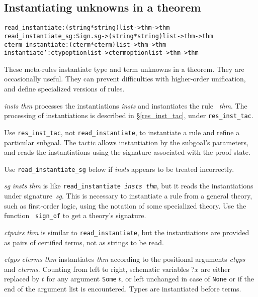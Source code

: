 \subsection{Instantiating unknowns in a theorem} \label{sec:instantiate}
\begin{alltt}\footnotesize
read_instantiate    :                (string*string) list -> thm -> thm
read_instantiate_sg :     Sign.sg -> (string*string) list -> thm -> thm
cterm_instantiate   :                  (cterm*cterm) list -> thm -> thm
instantiate'      : ctyp option list -> cterm option list -> thm -> thm
\end{alltt}
These meta-rules instantiate type and term unknowns in a theorem.  They are
occasionally useful.  They can prevent difficulties with higher-order
unification, and define specialized versions of rules.
\begin{ttdescription}
\item[\ttindexbold{read_instantiate} {\it insts} {\it thm}] 
processes the instantiations {\it insts} and instantiates the rule~{\it
thm}.  The processing of instantiations is described
in \S\ref{res_inst_tac}, under {\tt res_inst_tac}.  

Use {\tt res_inst_tac}, not {\tt read_instantiate}, to instantiate a rule
and refine a particular subgoal.  The tactic allows instantiation by the
subgoal's parameters, and reads the instantiations using the signature
associated with the proof state.

Use {\tt read_instantiate_sg} below if {\it insts\/} appears to be treated
incorrectly.

\item[\ttindexbold{read_instantiate_sg} {\it sg} {\it insts} {\it thm}]
  is like \texttt{read_instantiate {\it insts}~{\it thm}}, but it reads
  the instantiations under signature~{\it sg}.  This is necessary to
  instantiate a rule from a general theory, such as first-order logic,
  using the notation of some specialized theory.  Use the function {\tt
    sign_of} to get a theory's signature.

\item[\ttindexbold{cterm_instantiate} {\it ctpairs} {\it thm}] 
is similar to {\tt read_instantiate}, but the instantiations are provided
as pairs of certified terms, not as strings to be read.

\item[\ttindexbold{instantiate'} {\it ctyps} {\it cterms} {\it thm}]
  instantiates {\it thm} according to the positional arguments {\it
    ctyps} and {\it cterms}.  Counting from left to right, schematic
  variables $?x$ are either replaced by $t$ for any argument
  \texttt{Some\(\;t\)}, or left unchanged in case of \texttt{None} or
  if the end of the argument list is encountered.  Types are
  instantiated before terms.

\end{ttdescription}


